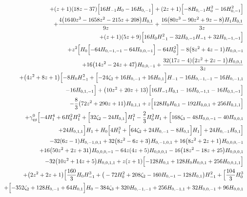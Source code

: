 \begin{eqnarray}
\nonumber \\ &&
+(z+1) (18 z-37) \Bigl[16  H_{-1}H_0-16  H_{0,-1}\Bigr]+(2 z+1) \Bigl[-8 H_{0,-1} H_0^2-16H_{0,-1}^2\Bigr]
\nonumber \\ &&
+\frac{4 \big(1640 z^3-1658 z^2-215 z+208\big) H_{0,1}}{9  z}+\frac{16 \big(80 z^3-90 z^2+9 z-8\big) H_1 H_{0,1}}{3 z}
\nonumber \\ &&
+(z+1) (5 z+9)\Bigl[16  H_0 H_{-1}^2-32  H_{0,-1} H_{-1}+32 H_{0,-1,-1}\Bigr]
\nonumber \\ &&
+z^2 \Bigl[H_0 \Bigl[-64 H_{0,-1,-1}-64 H_{0,0,-1}\Bigr]-64 H_0^2\Bigr]-8 \big(8 z^2+4 z-1\big) H_{0,0,-1}
\nonumber \\ &&
+16  \big(14 z^2-24z+47\big) H_{0,0,-1}+\frac{32 (17 z-4) \big(2 z^2+2 z-1\big) H_{0,0,1}}{3  z}
\nonumber \\ &&
+\big(4 z^2+8 z+1\big) \Bigl[-8 H_0 H_{-1}^2+\Bigl[-24 \zeta_2+16H_{0,-1}+16 H_{0,1}\Bigr] H_{-1}-16 H_{0,-1,-1}-16 H_{0,-1,1}
\nonumber \\ &&
-16H_{0,1,-1}\Bigr]+\big(10 z^2+20 z+13\big) \Bigl[16  H_{-1} H_{0,1}-16 H_{0,-1,1}-16  H_{0,1,-1}\Bigr]
\nonumber \\ &&
-\frac{8}{3} \big(72 z^2+290 z+11\big) H_{0,1,1}+z \Bigl[128  H_0 H_{0,1}-192  H_{0,0,1}+256 H_{0,1,1}\Bigr]
\nonumber \\ &&
+{\gamma}_{qg}^{0} \Bigl[-4 H_1^4+6 H_0^2H_1^2+\Bigl[32 \zeta_2-24 H_{0,1}\Bigr] H_1^2-\frac{2}{3} H_0^3H_1+\Bigl[168 \zeta_3-48 H_{0,0,-1}-40 H_{0,0,1}
\nonumber \\ &&
+24 H_{0,1,1}\Bigr] H_1+H_0\Bigl[4 H_1^3+\Bigl[64 \zeta_2+24 H_{0,-1}-8 H_{0,1}\Bigr] H_1\Bigr]+24H_{0,-1} H_{0,1}\Bigr]
\nonumber \\ &&
-32  (6 z-1) H_{0,-1,0,1}+32 \big(8 z^2-6 z+3\big)H_{0,-1,0,1}+16 \big(8 z^2+2 z+1\big) H_{0,0,0,-1}
\nonumber \\ &&
+16  \big(50 z^2+2z+31\big) H_{0,0,0,-1}-64  z (4 z+5) H_{0,0,0,1}-16 \big(18 z^2-18z+25\big) H_{0,0,0,1}
\nonumber \\ &&
-32 \big(10 z^2+14 z+5\big) H_{0,0,1,1}+z (z+1) \Bigl[-128 H_{0,1}+128  H_0 H_{0,0,1}+256  H_{0,0,1,1}\Bigr]
\nonumber \\ &&
+\big(2z^2+2 z+1\big) \Bigl[\frac{160}{3} H_0 H_{-1}^3+\big(-72 H_0^2+208 \zeta_2
-160 H_{0,-1}-128 H_{0,1}\big)H_{-1}^2
+\Bigl[\frac{104}{3} H_0^3
\nonumber \\ &&
+\Bigl[-352 \zeta_2+128 H_{0,-1}+64 H_{0,1}\Bigr]H_0-384 \zeta_3
+320H_{0,-1,-1}+256 H_{0,-1,1}+32 H_{0,0,-1}+96 H_{0,0,1}

\end{eqnarray}
